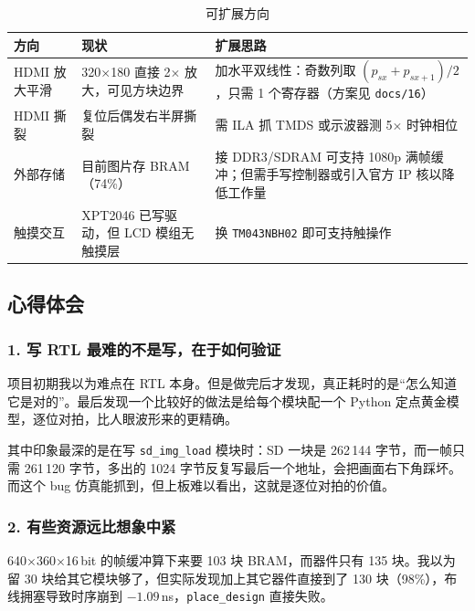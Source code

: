 \documentclass[withoutpreface,bwprint]{cumcmthesis}
\begin{document}
\begin{table}[H]
\centering
\caption{可扩展方向}
\label{tab:extend}
\begin{tabular}{p{2.4cm}p{4.4cm}p{6.2cm}}
\toprule[1.5pt]
\rowcolor{gray!25} 方向 & 现状 & 扩展思路 \\
\midrule[1pt]
HDMI 放大平滑 & 320$\times$180 直接 2$\times$ 放大，可见方块边界 & 加水平双线性：奇数列取 $(p_{sx}+p_{sx+1})/2$，只需 1 个寄存器（方案见 \texttt{docs/16}）\\
HDMI 撕裂 & 复位后偶发右半屏撕裂 & 需 ILA 抓 TMDS 或示波器测 5$\times$ 时钟相位 \\
外部存储 & 目前图片存 BRAM（74\%） & 接 DDR3/SDRAM 可支持 1080p 满帧缓冲；但需手写控制器或引入官方 IP 核以降低工作量 \\
触摸交互 & XPT2046 已写驱动，但 LCD 模组无触摸层 & 换 \texttt{TM043NBH02} 即可支持触操作 \\
\bottomrule[1.5pt]
\end{tabular}
\end{table}

\subsection{心得体会}

\subsubsection*{1. 写 RTL 最难的不是写，在于如何验证}

项目初期我以为难点在 RTL 本身。但是做完后才发现，真正耗时的是“怎么知道它是对的”。最后发现一个比较好的做法是给每个模块配一个 Python 定点黄金模型，逐位对拍，比人眼波形来的更精确。

其中印象最深的是在写 \texttt{sd\_img\_load} 模块时：SD 一块是 262\,144 字节，而一帧只需 261\,120 字节，多出的 1024 字节反复写最后一个地址，会把画面右下角踩坏。而这个 bug 仿真能抓到，但上板难以看出，这就是逐位对拍的价值。

\subsubsection*{2. 有些资源远比想象中紧}

640$\times$360$\times$16\,bit 的帧缓冲算下来要 103 块 BRAM，而器件只有 135 块。我以为留 30 块给其它模块够了，但实际发现加上其它器件直接到了 130 块（98\%），布线拥塞导致时序崩到 $-1.09$\,ns，\texttt{place\_design} 直接失败。
\end{document}
